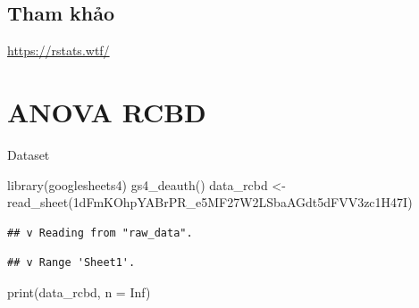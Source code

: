 \documentclass[
]{book}
\newenvironment{Shaded}{\begin{snugshade}}{\end{snugshade}}
\newcommand{\AttributeTok}[1]{\textcolor[rgb]{0.77,0.63,0.00}{#1}}
\newcommand{\ConstantTok}[1]{\textcolor[rgb]{0.00,0.00,0.00}{#1}}
\newcommand{\FunctionTok}[1]{\textcolor[rgb]{0.00,0.00,0.00}{#1}}
\newcommand{\NormalTok}[1]{#1}
\newcommand{\OtherTok}[1]{\textcolor[rgb]{0.56,0.35,0.01}{#1}}
\newcommand{\StringTok}[1]{\textcolor[rgb]{0.31,0.60,0.02}{#1}}
\begin{document}
\hypertarget{tham-khux1ea3o}{%
\section{Tham khảo}\label{tham-khux1ea3o}}

\url{https://rstats.wtf/}

\hypertarget{anova-rcbd}{%
\chapter{ANOVA RCBD}\label{anova-rcbd}}

Dataset

\begin{Shaded}
\begin{Highlighting}[]
\FunctionTok{library}\NormalTok{(googlesheets4)}
\FunctionTok{gs4\_deauth}\NormalTok{()}
\NormalTok{data\_rcbd }\OtherTok{\textless{}{-}} \FunctionTok{read\_sheet}\NormalTok{(}\StringTok{\textquotesingle{}1dFmKOhpYABrPR\_e5MF27W2LSbaAGdt5dFVV3zc1H47I\textquotesingle{}}\NormalTok{)}
\end{Highlighting}
\end{Shaded}

\begin{verbatim}
## v Reading from "raw_data".
\end{verbatim}

\begin{verbatim}
## v Range 'Sheet1'.
\end{verbatim}

\begin{Shaded}
\begin{Highlighting}[]
\FunctionTok{print}\NormalTok{(data\_rcbd, }\AttributeTok{n =} \ConstantTok{Inf}\NormalTok{)}
\end{Highlighting}
\end{Shaded}
\end{document}
